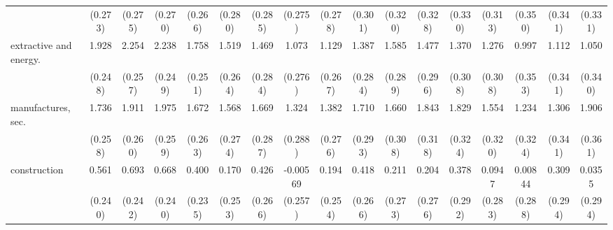 {\begin{tabular}{l*{16}{c}}
                    &     (0.273)         &     (0.275)         &     (0.270)         &     (0.266)         &     (0.280)         &     (0.285)         &     (0.275)         &     (0.278)         &     (0.301)         &     (0.320)         &     (0.328)         &     (0.330)         &     (0.313)         &     (0.350)         &     (0.341)         &     (0.331)         \\
[1em]
extractive and energy.&       1.928\sym{***}&       2.254\sym{***}&       2.238\sym{***}&       1.758\sym{***}&       1.519\sym{***}&       1.469\sym{***}&       1.073\sym{***}&       1.129\sym{***}&       1.387\sym{***}&       1.585\sym{***}&       1.477\sym{***}&       1.370\sym{***}&       1.276\sym{***}&       0.997\sym{**} &       1.112\sym{**} &       1.050\sym{**} \\
                    &     (0.248)         &     (0.257)         &     (0.249)         &     (0.251)         &     (0.264)         &     (0.284)         &     (0.276)         &     (0.267)         &     (0.284)         &     (0.289)         &     (0.296)         &     (0.308)         &     (0.308)         &     (0.353)         &     (0.341)         &     (0.340)         \\
[1em]
manufactures, sec.  &       1.736\sym{***}&       1.911\sym{***}&       1.975\sym{***}&       1.672\sym{***}&       1.568\sym{***}&       1.669\sym{***}&       1.324\sym{***}&       1.382\sym{***}&       1.710\sym{***}&       1.660\sym{***}&       1.843\sym{***}&       1.829\sym{***}&       1.554\sym{***}&       1.234\sym{***}&       1.306\sym{***}&       1.906\sym{***}\\
                    &     (0.258)         &     (0.260)         &     (0.259)         &     (0.263)         &     (0.274)         &     (0.287)         &     (0.288)         &     (0.276)         &     (0.293)         &     (0.308)         &     (0.318)         &     (0.324)         &     (0.320)         &     (0.324)         &     (0.341)         &     (0.361)         \\
[1em]
construction        &       0.561\sym{*}  &       0.693\sym{**} &       0.668\sym{**} &       0.400         &       0.170         &       0.426         &    -0.00569         &       0.194         &       0.418         &       0.211         &       0.204         &       0.378         &      0.0947         &     0.00844         &       0.309         &      0.0355         \\
                    &     (0.240)         &     (0.242)         &     (0.240)         &     (0.235)         &     (0.253)         &     (0.266)         &     (0.257)         &     (0.254)         &     (0.266)         &     (0.273)         &     (0.276)         &     (0.292)         &     (0.283)         &     (0.288)         &     (0.294)         &     (0.294)         \\

\end{tabular}}
